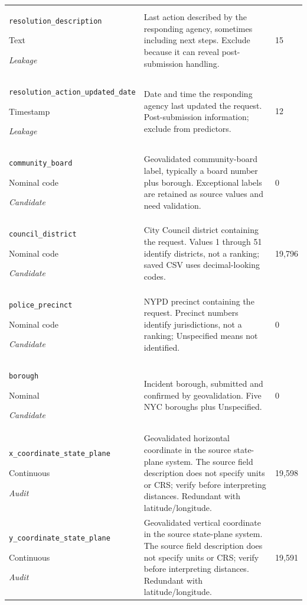 \begin{longtable}{@{}p{.27\linewidth}p{.60\linewidth}p{.07\linewidth}@{}}
\texttt{resolution\_\allowbreak{}description}\par Text\par\emph{Leakage} & Last action described by the responding agency, sometimes including next steps. Exclude because it can reveal post-submission handling. & 15\\
\texttt{resolution\_\allowbreak{}action\_\allowbreak{}updated\_\allowbreak{}date}\par Timestamp\par\emph{Leakage} & Date and time the responding agency last updated the request. Post-submission information; exclude from predictors. & 12\\
\texttt{community\_\allowbreak{}board}\par Nominal code\par\emph{Candidate} & Geovalidated community-board label, typically a board number plus borough. Exceptional labels are retained as source values and need validation. & 0\\
\texttt{council\_\allowbreak{}district}\par Nominal code\par\emph{Candidate} & City Council district containing the request. Values 1 through 51 identify districts, not a ranking; saved CSV uses decimal-looking codes. & 19,796\\
\texttt{police\_\allowbreak{}precinct}\par Nominal code\par\emph{Candidate} & NYPD precinct containing the request. Precinct numbers identify jurisdictions, not a ranking; Unspecified means not identified. & 0\\
\texttt{borough}\par Nominal\par\emph{Candidate} & Incident borough, submitted and confirmed by geovalidation. Five NYC boroughs plus Unspecified. & 0\\
\texttt{x\_\allowbreak{}coordinate\_\allowbreak{}state\_\allowbreak{}plane}\par Continuous\par\emph{Audit} & Geovalidated horizontal coordinate in the source state-plane system. The source field description does not specify units or CRS; verify before interpreting distances. Redundant with latitude/longitude. & 19,598\\
\texttt{y\_\allowbreak{}coordinate\_\allowbreak{}state\_\allowbreak{}plane}\par Continuous\par\emph{Audit} & Geovalidated vertical coordinate in the source state-plane system. The source field description does not specify units or CRS; verify before interpreting distances. Redundant with latitude/longitude. & 19,591\\

\end{longtable}
